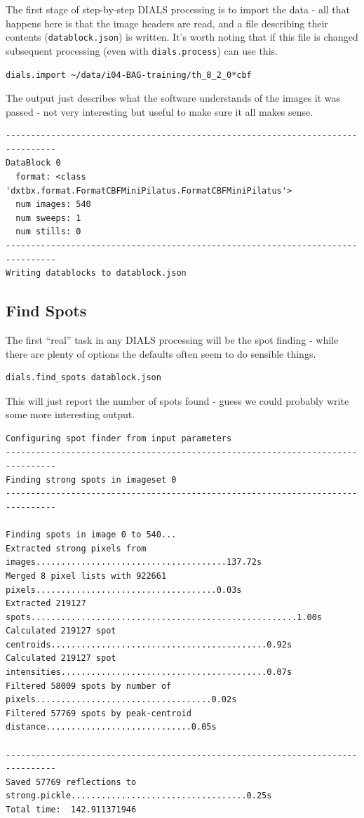 \documentclass[a4paper, 11pt]{article}
\begin{document}
The first stage of step-by-step DIALS processing is to import the data
- all that happens here is that the image headers are read, and a file
describing their contents (\verb|datablock.json|) is written. It's
worth noting that if this file is changed subsequent processing (even
with \verb|dials.process|) can use this.

{\small
\begin{verbatim}
dials.import ~/data/i04-BAG-training/th_8_2_0*cbf
\end{verbatim}
}

\noindent 
The output just describes what the software understands of the images
it was passed - not very interesting but useful to make sure it all
makes sense.

{\small
\begin{verbatim}
--------------------------------------------------------------------------------
DataBlock 0
  format: <class 'dxtbx.format.FormatCBFMiniPilatus.FormatCBFMiniPilatus'>
  num images: 540
  num sweeps: 1
  num stills: 0
--------------------------------------------------------------------------------
Writing datablocks to datablock.json
\end{verbatim}
}

\subsection{Find Spots}

The first ``real'' task in any DIALS processing will be the spot
finding - while there are plenty of options the defaults often seem to
do sensible things.

{\small
\begin{verbatim}
dials.find_spots datablock.json 
\end{verbatim}
}

\noindent
This will just report the number of spots found - guess we could
probably write some more interesting output.

{\small
\begin{verbatim}
Configuring spot finder from input parameters
--------------------------------------------------------------------------------
Finding strong spots in imageset 0
--------------------------------------------------------------------------------

Finding spots in image 0 to 540...
Extracted strong pixels from images......................................137.72s
Merged 8 pixel lists with 922661 pixels....................................0.03s
Extracted 219127 spots.....................................................1.00s
Calculated 219127 spot centroids...........................................0.92s
Calculated 219127 spot intensities.........................................0.07s
Filtered 58009 spots by number of pixels...................................0.02s
Filtered 57769 spots by peak-centroid distance.............................0.05s

--------------------------------------------------------------------------------
Saved 57769 reflections to strong.pickle...................................0.25s
Total time:  142.911371946 
\end{verbatim}
}
\end{document}
